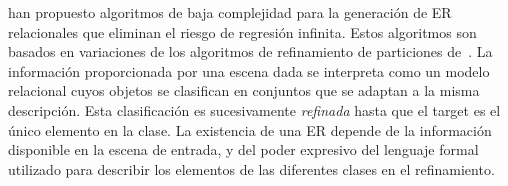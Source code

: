 \cite{arec2:2008:Areces,arec:usin11} han propuesto algoritmos de baja complejidad
 para la generaci\'on de ER relacionales que eliminan el riesgo de regresi\'on infinita. Estos algoritmos son
basados en variaciones de los algoritmos de refinamiento de particiones
de~\cite{paig:thre87}. La informaci\'on proporcionada por una escena dada
se interpreta como un modelo relacional cuyos objetos se clasifican en
conjuntos que se adaptan a la misma descripci\'on. Esta clasificaci\'on es
sucesivamente \emph{refinada} hasta que el target es el \'unico elemento
en la clase. La existencia de una ER depende
de la informaci\'on disponible en la escena de entrada, y del poder expresivo
del lenguaje formal utilizado para describir los elementos de las
diferentes clases en el refinamiento.\\






